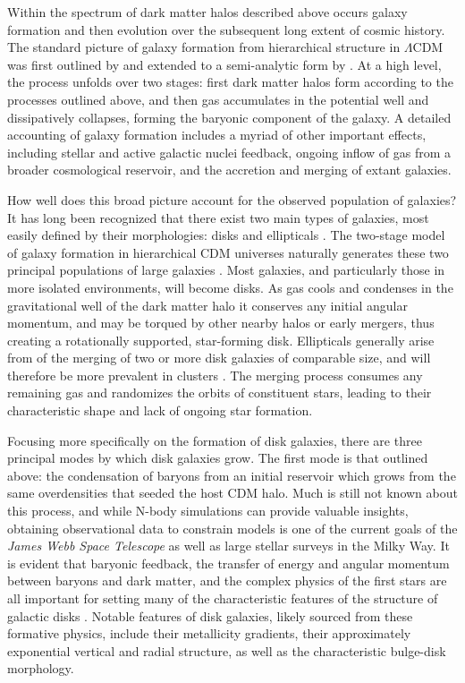 Within the spectrum of dark matter halos described above occurs galaxy formation and then evolution over the subsequent long extent of cosmic history. The standard picture of galaxy formation from hierarchical structure in $\Lambda$CDM was first outlined by \textcite{white78} and extended to a semi-analytic form by \textcite{white91}. At a high level, the process unfolds over two stages: first dark matter halos form according to the processes outlined above, and then gas accumulates in the potential well and dissipatively collapses, forming the baryonic component of the galaxy. A detailed accounting of galaxy formation includes a myriad of other important effects, including stellar and active galactic nuclei feedback, ongoing inflow of gas from a broader cosmological reservoir, and the accretion and merging of extant galaxies.

How well does this broad picture account for the observed population of galaxies? It has long been recognized that there exist two main types of galaxies, most easily defined by their morphologies: disks and ellipticals \parencite[e.g. the famous `tuning fork' classification of][]{hubble26}. The two-stage model of galaxy formation in hierarchical CDM universes naturally generates these two principal populations of large galaxies \parencite{fall79,efstathiou83,blumenthal84}. Most galaxies, and particularly those in more isolated environments, will become disks. As gas cools and condenses in the gravitational well of the dark matter halo it conserves any initial angular momentum, and may be torqued by other nearby halos or early mergers, thus creating a rotationally supported, star-forming disk. Ellipticals generally arise from of the merging of two or more disk galaxies of comparable size, and will therefore be more prevalent in clusters \parencite{toomre72,gerhard81,barnes88}. The merging process consumes any remaining gas and randomizes the orbits of constituent stars, leading to their characteristic shape and lack of ongoing star formation.

Focusing more specifically on the formation of disk galaxies, there are three principal modes by which disk galaxies grow. The first mode is that outlined above: the condensation of baryons from an initial reservoir which grows from the same overdensities that seeded the host CDM halo. Much is still not known about this process, and while N-body simulations can provide valuable insights, obtaining observational data to constrain models is one of the current goals of the \textit{James Webb Space Telescope} as well as large stellar surveys in the Milky Way. It is evident that baryonic feedback, the transfer of energy and angular momentum between baryons and dark matter, and the complex physics of the first stars are all important for setting many of the characteristic features of the structure of galactic disks \parencite{vandenbosch01}. Notable features of disk galaxies, likely sourced from these formative physics, include their metallicity gradients, their approximately exponential vertical and radial structure, as well as the characteristic bulge-disk morphology.

